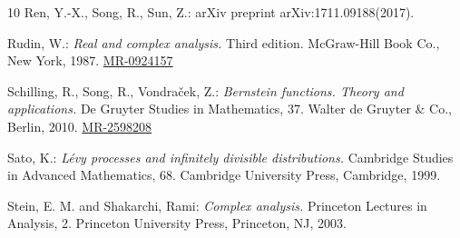 \documentclass[12pt,oneside,english]{amsart}
\def\MR#1{\href{http://www.ams.org/mathscinet-getitem?mr=#1}{MR-#1}}
\theoremstyle{plain}
\theoremstyle{definition}
\numberwithin{equation}{section}
\begin{document}
\begin{thebibliography} {10}
Ren, Y.-X., Song, R., Sun, Z.:
 arXiv preprint arXiv:1711.09188(2017).

Rudin, W.:
\emph{Real and complex analysis.}
Third edition. McGraw-Hill Book Co., New York, 1987.
\MR{0924157}

Schilling, R., Song, R., Vondra\v{c}ek, Z.:
\emph{Bernstein functions. Theory and applications.}
De Gruyter Studies in Mathematics, 37. Walter de Gruyter \& Co., Berlin, 2010.
\MR{2598208}


Sato, K.:
\emph{Lévy processes and infinitely divisible distributions.}
Cambridge Studies in Advanced Mathematics, 68. Cambridge University Press, Cambridge, 1999.

Stein, E. M. and Shakarchi, Rami:
\emph{Complex analysis.}
Princeton Lectures in Analysis, 2. Princeton University Press, Princeton, NJ, 2003.

\end{thebibliography}
\end{document}

